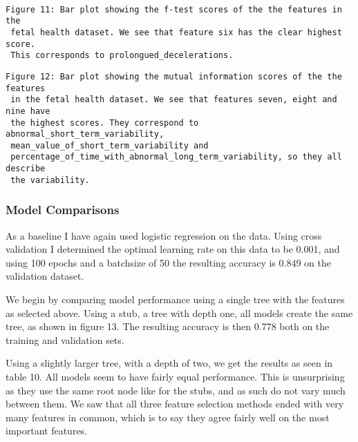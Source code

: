 \documentclass[11pt]{article}
\begin{document}
 
 \begin{center}
 \end{center}
 { \hspace*{\fill} \\}
 
 \begin{Verbatim}[commandchars=\\\{\}]
 Figure 11: Bar plot showing the f-test scores of the the features in the 
 fetal health dataset. We see that feature six has the clear highest score. 
 This corresponds to prolongued_decelerations.
 \end{Verbatim}


 
 \begin{center}
 \end{center}
 \begin{Verbatim}[commandchars=\\\{\}]
 Figure 12: Bar plot showing the mutual information scores of the the  features 
 in the fetal health dataset. We see that features seven, eight and nine have 
 the highest scores. They correspond to abnormal_short_term_variability, 
 mean_value_of_short_term_variability and 
 percentage_of_time_with_abnormal_long_term_variability, so they all describe 
 the variability.
\end{Verbatim}
  
     \hypertarget{model-comparisons2}{%
 	\subsubsection{Model Comparisons}\label{model-comparisons2}}

As a baseline I have again used logistic regression on the data. Using cross validation I determined the optimal learning rate on this data to be 0.001, and using 100 epochs and a batchsize of 50 the resulting accuracy is 0.849 on the validation dataset.

We begin by comparing model performance using a single tree with the features as selected above. Using a stub, a tree with depth one, all models create the same tree, as shown in figure 13. The resulting accuracy is then 0.778 both on the training and validation sets.

Using a slightly larger tree, with a depth of two, we get the results as seen in table 10. All models seem to have fairly equal performance. This is unsurprising as they use the same root node like for the stubs, and as such do not vary much between them. We saw that all three feature selection methods ended with very many features in common, which is to say they agree fairly well on the most important features. 
\end{document}

